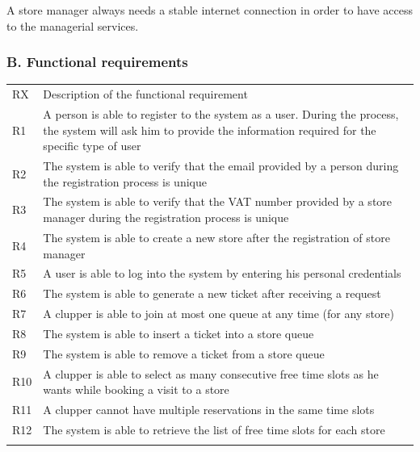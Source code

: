\documentclass[
]{article}
\begin{document}
A store manager always needs a stable internet connection in order to
have access to the managerial services.

\hypertarget{b.-functional-requirements}{%
\subsubsection{B. Functional
requirements}\label{b.-functional-requirements}}

\begin{longtable}[]{@{}
  >{\raggedright\arraybackslash}p{}
  >{\raggedright\arraybackslash}p{}@{}}
\toprule
RX & Description of the functional requirement \\ \addlinespace
\midrule
\endhead
R1 & A person is able to register to the system as a user. During the
process, the system will ask him to provide the information required for
the specific type of user \\ \addlinespace
R2 & The system is able to verify that the email provided by a person
during the registration process is unique \\ \addlinespace
R3 & The system is able to verify that the VAT number provided by a
store manager during the registration process is unique \\ \addlinespace
R4 & The system is able to create a new store after the registration of
store manager \\ \addlinespace
R5 & A user is able to log into the system by entering his personal
credentials \\ \addlinespace
R6 & The system is able to generate a new ticket after receiving a
request \\ \addlinespace
R7 & A clupper is able to join at most one queue at any time (for any
store) \\ \addlinespace
R8 & The system is able to insert a ticket into a store
queue \\ \addlinespace
R9 & The system is able to remove a ticket from a store
queue \\ \addlinespace
R10 & A clupper is able to select as many consecutive free time slots as
he wants while booking a visit to a store \\ \addlinespace
R11 & A clupper cannot have multiple reservations in the same time
slots \\ \addlinespace
R12 & The system is able to retrieve the list of free time slots for
each store \\ \addlinespace

\end{longtable}
\end{document}
